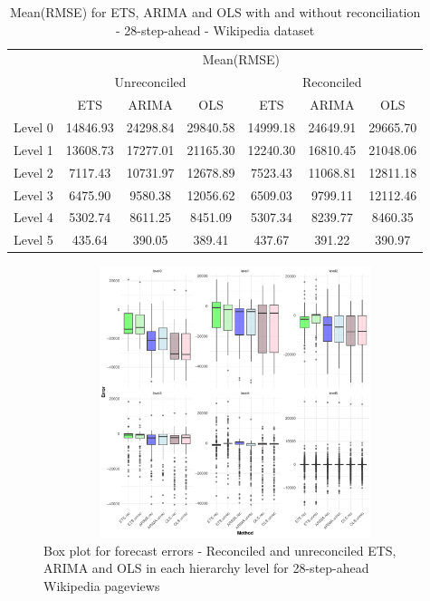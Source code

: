 \documentclass[11pt,a4paper,]{article}
\begin{document}
\begin{table}

\caption{\label{tab:wikipediadataresultRMSE}Mean(RMSE) for ETS, ARIMA and OLS with and without reconciliation - 28-step-ahead - Wikipedia dataset}
\centering
\begin{tabular}[t]{ccccccc}
\toprule
\multicolumn{1}{c}{} & \multicolumn{6}{c}{Mean(RMSE)} \\
\cmidrule(l{2pt}r{2pt}){2-7}
\multicolumn{1}{c}{} & \multicolumn{3}{c}{Unreconciled} & \multicolumn{3}{c}{Reconciled} \\
\cmidrule(l{2pt}r{2pt}){2-4} \cmidrule(l{2pt}r{2pt}){5-7}
 & ETS & ARIMA & OLS & ETS & ARIMA & OLS\\
\midrule
Level 0 & 14846.93 & 24298.84 & 29840.58 & 14999.18 & 24649.91 & 29665.70\\
Level 1 & 13608.73 & 17277.01 & 21165.30 & 12240.30 & 16810.45 & 21048.06\\
Level 2 & 7117.43 & 10731.97 & 12678.89 & 7523.43 & 11068.81 & 12811.18\\
Level 3 & 6475.90 & 9580.38 & 12056.62 & 6509.03 & 9799.11 & 12112.46\\
Level 4 & 5302.74 & 8611.25 & 8451.09 & 5307.34 & 8239.77 & 8460.35\\
Level 5 & 435.64 & 390.05 & 389.41 & 437.67 & 391.22 & 390.97\\
\bottomrule
\end{tabular}
\end{table}

\begin{figure}

{\centering \includegraphics[width=450px,height=300px]{Paper-Figures/results_Wikipedia/boxplot_28} 

}

\caption{Box plot for forecast errors -  Reconciled and unreconciled ETS, ARIMA and OLS in each hierarchy level for 28-step-ahead Wikipedia pageviews}\label{fig:boxplotwiki}
\end{figure}
\end{document}

